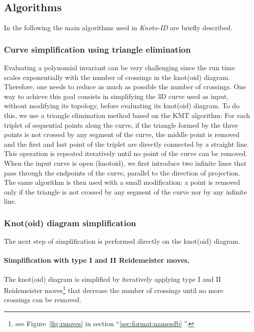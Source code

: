 \subsection{\label{sec:algorithms}Algorithms}
In the following the main algorithms used in {\it Knoto-ID} are briefly described.

\subsubsection{\label{sec:algorithms:3dsimplication}Curve simplification using triangle elimination}
Evaluating a polynomial invariant can be very challenging  since the run time scales exponentially with the number of crossings in the knot(oid) diagram. Therefore, one needs to reduce as much as possible the number of crossings. One way to achieve this goal consists in simplifying the 3D curve used as input, without modifying its topology, before evaluating its knot(oid) diagram. To do this, we use a triangle elimination method based on the KMT algorithm\cite{Koniaris1991}\cite{taylor2000}: For each triplet of sequential points along the curve, if the triangle formed by the three points is not crossed by any segment of the curve, the middle point is removed and the first and last point of the triplet are directly connected by a straight line.
This operation is repeated iteratively until no point of the curve can be removed.
When the input curve is open (knotoid), we first introduce two infinite lines that pass through the endpoints of the curve, parallel to the direction of projection. The same algorithm is then used with a small modification: a point is removed only if the triangle is not crossed by any segment of the curve nor by any infinite line.

\subsubsection{\label{sec:algorithms:diagramsimplication}Knot(oid) diagram simplification}
The next step of simplification is performed directly on the knot(oid) diagram.

\paragraph{Simplification with type I and II Reidemeister moves.}
The knot(oid) diagram is simplified by iteratively applying type I and II Reidemeister moves\footnote{see Figure~\ref{fig:rmoves} in section ``\ref{sec:format:namesdb} ''.} that decrease the number of crossings until no more crossings can be removed.


